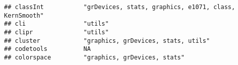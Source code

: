 \documentclass[
]{article}
\begin{document}
\begin{verbatim}
## classInt           "grDevices, stats, graphics, e1071, class, KernSmooth"                                                                                                                                                                                                                                                                                                                                                                                       
## cli                "utils"                                                                                                                                                                                                                                                                                                                                                                                                                                      
## clipr              "utils"                                                                                                                                                                                                                                                                                                                                                                                                                                      
## cluster            "graphics, grDevices, stats, utils"                                                                                                                                                                                                                                                                                                                                                                                                          
## codetools          NA                                                                                                                                                                                                                                                                                                                                                                                                                                           
## colorspace         "graphics, grDevices, stats"                                                                                                                                                                                                                                                                                                                                                                                                                 

\end{verbatim}
\end{document}
